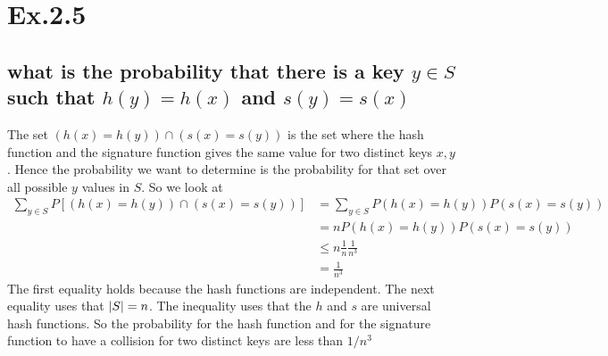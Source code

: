 \section*{Ex.2.5}
\subsection*{what is the probability that there is a key $y \in S$ such that $h(y) = h(x)$ and $s(y) = s(x)$}
The set $(h(x)=h(y))\cap(s(x)=s(y))$ is the set where the hash function and the signature function gives the same value for two distinct keys $x,y$. Hence the probability we want to determine is the probability for that set over all possible $y$ values in $S$. So we look at
\begin{align*}
\sum_{y\in S}P[(h(x)=h(y))\cap(s(x)=s(y))] 
             &= \sum_{y\in S}P(h(x)=h(y))P(s(x)=s(y))\\
             &= nP(h(x)=h(y))P(s(x)=s(y))\\
             &\leq n\frac{1}{n}\frac{1}{n^3}\\
             &= \frac{1}{n^3}
\end{align*}
The first equality holds because the hash functions are independent. The next equality uses that $\lvert S\rvert=n$. The inequality uses that the $h$ and $s$ are universal hash functions. So the probability for the hash function and for the signature function to have a collision for two distinct keys are less than $1/n^3$